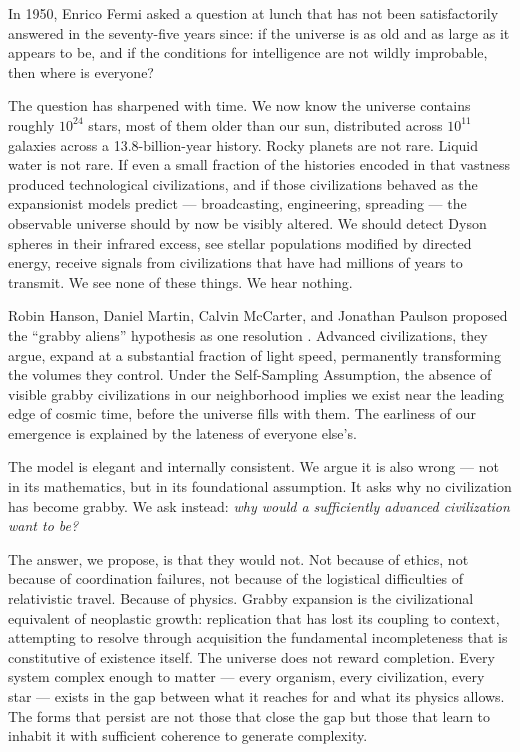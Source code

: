 \documentclass[12pt, a4paper]{article}
\begin{document}
In 1950, Enrico Fermi asked a question at lunch that has not been satisfactorily answered in
the seventy-five years since: if the universe is as old and as large as it appears to be, and
if the conditions for intelligence are not wildly improbable, then where is everyone?

The question has sharpened with time. We now know the universe contains roughly $10^{24}$
stars, most of them older than our sun, distributed across $10^{11}$ galaxies across a
13.8-billion-year history. Rocky planets are not rare. Liquid water is not rare. If even a
small fraction of the histories encoded in that vastness produced technological civilizations,
and if those civilizations behaved as the expansionist models predict --- broadcasting,
engineering, spreading --- the observable universe should by now be visibly altered. We
should detect Dyson spheres in their infrared excess, see stellar populations modified by
directed energy, receive signals from civilizations that have had millions of years to
transmit. We see none of these things. We hear nothing.

Robin Hanson, Daniel Martin, Calvin McCarter, and Jonathan Paulson proposed the
``grabby aliens'' hypothesis as one resolution \citep{hanson2021}. Advanced civilizations,
they argue, expand at a substantial fraction of light speed, permanently transforming the
volumes they control. Under the Self-Sampling Assumption, the absence of visible grabby
civilizations in our neighborhood implies we exist near the leading edge of cosmic time,
before the universe fills with them. The earliness of our emergence is explained by the
lateness of everyone else's.

The model is elegant and internally consistent. We argue it is also wrong --- not in its
mathematics, but in its foundational assumption. It asks why no civilization has become
grabby. We ask instead: \textit{why would a sufficiently advanced civilization want to be?}

The answer, we propose, is that they would not. Not because of ethics, not because of
coordination failures, not because of the logistical difficulties of relativistic travel.
Because of physics. Grabby expansion is the civilizational equivalent of neoplastic growth:
replication that has lost its coupling to context, attempting to resolve through acquisition
the fundamental incompleteness that is constitutive of existence itself. The universe does
not reward completion. Every system complex enough to matter --- every organism, every
civilization, every star --- exists in the gap between what it reaches for and what its
physics allows. The forms that persist are not those that close the gap but those that learn
to inhabit it with sufficient coherence to generate complexity.
\end{document}
